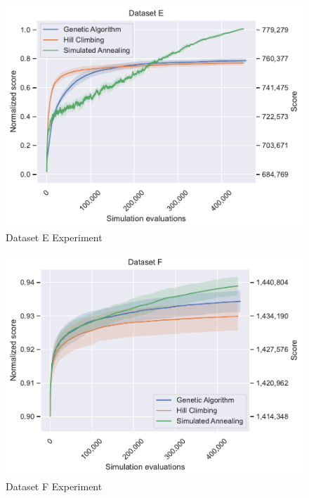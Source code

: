 \begin{figure}
    \centering
    \includegraphics[width=\linewidth]{img/experiments/e_Genetic Algorithm_Hill Climbing_Simulated Annealing.pdf}
    \caption[Dataset E Experiment]{
        Dataset E Experiment
    }
    \label{fig:dataset_e_experiment}
\end{figure}

\begin{figure}
    \centering
    \includegraphics[width=\linewidth]{img/experiments/f_Genetic Algorithm_Hill Climbing_Simulated Annealing.pdf}
    \caption[Dataset F Experiment]{
        Dataset F Experiment
    }
    \label{fig:dataset_f_experiment}
\end{figure}

